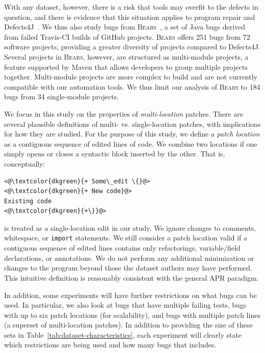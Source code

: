 \documentclass[10pt, conference]{IEEEtran}
\newcommand\bears{\textsc{Bears}\xspace}
\begin{document}
With any dataset, however, there is a risk that tools may overfit
to the defects in question, and there is evidence that this situation applies to
program repair and Defects4J~\cite{durieux-repair-them-all}. 
We thus also study bugs from \bears~\cite{bears}, 
a set of Java bugs derived from failed Travis-CI builds of GitHub projects. 
\bears offers 251 bugs from 72 software projects, providing a greater diversity of 
projects compared to Defects4J. 
Several projects in \bears, however, are structured as multi-module projects, a feature 
supported by Maven that allows developers to group multiple projects together. Multi-module 
projects are more complex to build and are not currently compatible with our automation tools.
We thus limit our analysis of \bears to 184 bugs from 34 single-module projects.

We focus in this study on the properties of \emph{multi-location} patches. There are
several plausible definitions of multi- vs. single-location patches, with
implications for how they are studied. For the purpose of this study, we define
a \emph{patch location} as a contiguous sequence of edited lines of code.  We
combine two locations if one simply opens or closes a syntactic block inserted
by the other. That is, conceptually:
\begin{lstlisting}[style=examplestyle]
<@\textcolor{dkgreen}{+ Some\_edit \{}@>
<@\textcolor{dkgreen}{+ New code}@>
Existing code
<@\textcolor{dkgreen}{+\}}@>
\end{lstlisting}
is treated as a single-location edit in our study. We ignore changes to
comments, whitespace, or \texttt{import} statements.
We still consider a patch location valid if a contiguous sequence of edited lines contains 
only refactorings, variable/field declarations, or annotations. We do not perform any 
additional minimization or changes to the program beyond those the dataset authors may 
have performed.
This intuitive definition is reasonably consistent with the general APR
paradigm. 

In addition, some experiments will have further restrictions on what bugs can be used. In 
particular, we also look at bugs that have multiple failing tests, bugs with up to six patch 
locations (for scalability), and bugs with multiple patch lines (a superset of multi-location 
patches). In addition to providing the size of these sets in 
Table~\ref{tab:dataset-characteristics}, each experiment will clearly state which restrictions are 
being used and how many bugs that includes.
\end{document}
